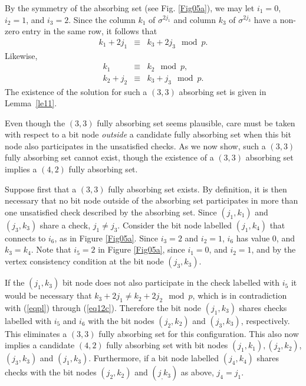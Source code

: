 By the symmetry of the absorbing set (see Fig. \ref{Fig05a}), we
may let $i_1=0$, $i_2=1$, and $i_3=2$. Since the column $k_1$ of
$\sigma^{2j_1}$ and column $k_3$ of $\sigma^{2j_3}$ have a
non-zero entry in the same row, it follows that
\begin{eqnarray}\label{eq12a}
k_1+2j_1 &\equiv & k_3+2j_3 \mod p.
\end{eqnarray}
Likewise,
\begin{eqnarray}\label{eq12b}
k_1 &\equiv& k_2   \mod p,\\
k_2 + j_2 &\equiv& k_3 +j_3  \mod p. \label{eq12c}
\end{eqnarray}
The existence of the solution for such a $(3,3)$ absorbing set is
given in Lemma~\ref{le11}. 

Even though the $(3,3)$ fully absorbing set seems plausible, care
must be taken with respect to a bit node \emph{outside} a
candidate fully absorbing set when this bit node also participates
in the unsatisfied checks. As we now show, such a $(3,3)$ fully
absorbing set cannot exist, though the existence of a $(3,3)$
absorbing set implies  a $(4,2)$ fully absorbing set.


Suppose first that a $(3,3)$ fully absorbing set exists. By
definition, it is then necessary that no bit node outside of the
absorbing set participates in more than one unsatisfied check
described by the absorbing set. Since $(j_1,k_1)$ and $(j_3,k_3)$
share a check, $j_1 \neq j_3$. Consider the bit node labelled
$(j_1,k_4)$ that connects to $i_6$, as in Figure \ref{Fig05a}.
Since $i_3=2$ and $i_2=1$, $i_6$ has value 0, and $k_3=k_4$. Note
that $i_5=2$ in Figure \ref{Fig05a}, since $i_1=0$, and $i_2=1$,
and by the vertex consistency condition at the bit node
$(j_3,k_3)$.

If the $(j_1,k_3)$ bit node does not also participate in the check
labelled with $i_5$ it would be necessary that $k_3+2j_1 \neq
k_2+2j_2 \mod p$, which is in contradiction with (\ref{eqpl})
through (\ref{eq12c}). Therefore the bit node $(j_1,k_3)$ shares
checks labelled with $i_5$ and $i_6$ with the bit nodes
$(j_2,k_2)$ and  $(j_3,k_3)$, respectively. This eliminates a
$(3,3)$ fully absorbing set for this configuration. This also now
implies a candidate $(4,2)$ fully absorbing set with bit nodes
$(j_1,k_1), (j_2,k_2)$, $(j_3,k_3)$ and $(j_1,k_3)$. Furthermore,
if a bit node labelled $(j_4,k_4)$ shares checks with the bit
nodes $(j_2,k_2)$ and $(j_,k_3)$ as above, $j_4=j_1$.

